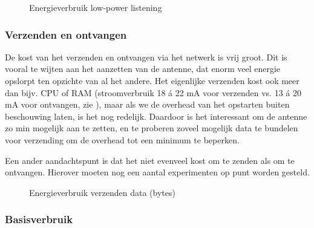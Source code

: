 \documentclass[11pt]{article}
\begin{document}
\begin{figure}[h]
\centering

\caption{Energieverbruik low-power listening}
\label{fig:energieverbruik_lpl}
\end{figure}


\subsubsection{Verzenden en ontvangen}

De kost van het verzenden en ontvangen via het netwerk is vrij groot. Dit is
vooral te wijten aan het aanzetten van de antenne, dat enorm veel energie
opslorpt ten opzichte van al het andere. Het eigenlijke verzenden kost ook meer
dan bijv. CPU of RAM (stroomverbruik 18 \'a 22 mA voor verzenden vs. 13 \'a 20
mA voor ontvangen, zie \cite{atmega128rfa1}), maar als we de overhead van het opstarten buiten beschouwing
laten, is het nog redelijk. Daardoor is het interessant om de antenne zo min
mogelijk aan te zetten, en te proberen zoveel mogelijk data te bundelen voor
verzending om de overhead tot een minimum te beperken.

Een ander aandachtspunt is dat het niet evenveel kost om te zenden als om te
ontvangen. Hierover moeten nog een aantal experimenten op punt worden gesteld.

\begin{figure}[h]
\centering

\caption{Energieverbruik verzenden data (bytes)}
\label{fig:energieverbruik_ant}
\end{figure}

\subsubsection{Basisverbruik}
\end{document}
